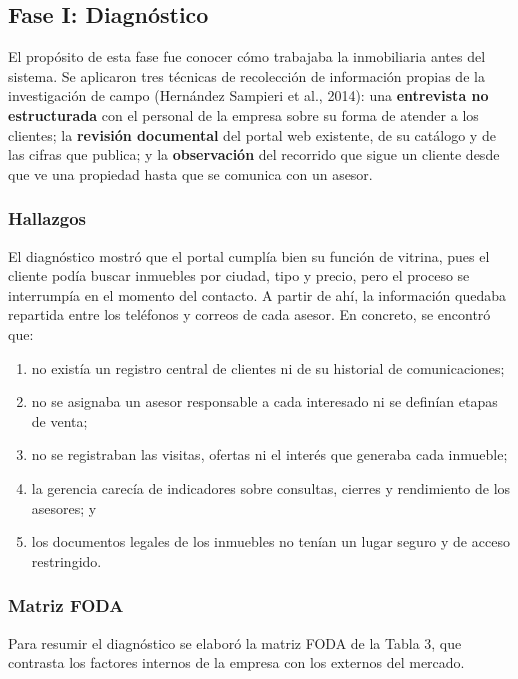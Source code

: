 \documentclass[stu,12pt,letterpaper,donotrepeattitle,floatsintext]{apa7}
\begin{document}
\subsection{Fase I: Diagnóstico}

El propósito de esta fase fue conocer cómo trabajaba la inmobiliaria antes del sistema. Se aplicaron tres técnicas de recolección de información propias de la investigación de campo (Hernández Sampieri et al., 2014): una \textbf{entrevista no estructurada} con el personal de la empresa sobre su forma de atender a los clientes; la \textbf{revisión documental} del portal web existente, de su catálogo y de las cifras que publica; y la \textbf{observación} del recorrido que sigue un cliente desde que ve una propiedad hasta que se comunica con un asesor.

\subsubsection{Hallazgos}

El diagnóstico mostró que el portal cumplía bien su función de vitrina, pues el cliente podía buscar inmuebles por ciudad, tipo y precio, pero el proceso se interrumpía en el momento del contacto. A partir de ahí, la información quedaba repartida entre los teléfonos y correos de cada asesor. En concreto, se encontró que:

\begin{enumerate}[label=\alph*)]
  \item no existía un registro central de clientes ni de su historial de comunicaciones;
  \item no se asignaba un asesor responsable a cada interesado ni se definían etapas de venta;
  \item no se registraban las visitas, ofertas ni el interés que generaba cada inmueble;
  \item la gerencia carecía de indicadores sobre consultas, cierres y rendimiento de los asesores; y
  \item los documentos legales de los inmuebles no tenían un lugar seguro y de acceso restringido.
\end{enumerate}

\subsubsection{Matriz FODA}

Para resumir el diagnóstico se elaboró la matriz FODA de la Tabla 3, que contrasta los factores internos de la empresa con los externos del mercado.
\end{document}

